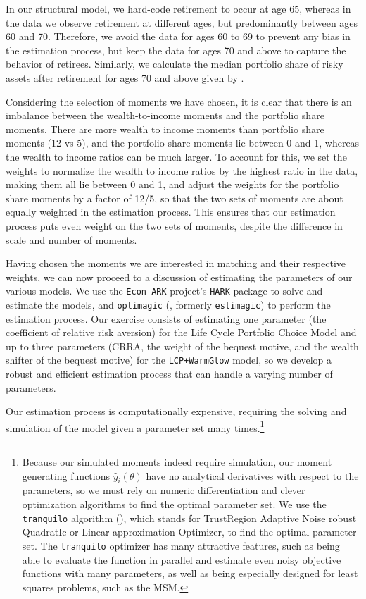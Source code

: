 \documentclass{article}
\begin{document}
In our structural model, we hard-code retirement to occur at age 65, whereas in the data we observe retirement at different ages, but predominantly between ages 60 and 70.
Therefore, we avoid the data for ages 60 to 69 to prevent any bias in the estimation process, but keep the data for ages 70 and above to capture the behavior of retirees.
Similarly, we calculate the median portfolio share of risky assets after retirement for ages 70 and above given by \cite{Aboagye2024}.

Considering the selection of moments we have chosen, it is clear that there is an imbalance between the wealth-to-income moments and the portfolio share moments.
There are more wealth to income moments than portfolio share moments (12 vs 5), and the portfolio share moments lie between 0 and 1, whereas the wealth to income ratios can be much larger.
To account for this, we set the weights to normalize the wealth to income ratios by the highest ratio in the data, making them all lie between 0 and 1, and adjust the weights for the portfolio share moments by a factor of 12/5, so that the two sets of moments are about equally weighted in the estimation process.
This ensures that our estimation process puts even weight on the two sets of moments, despite the difference in scale and number of moments.

Having chosen the moments we are interested in matching and their respective weights, we can now proceed to a discussion of estimating the parameters of our various models.
We use the \texttt{Econ-ARK} project's \texttt{HARK} package to solve and estimate the models, and \texttt{optimagic} (\cite{Gabler2022}, formerly \texttt{estimagic}) to perform the estimation process.
Our exercise consists of estimating one parameter (the coefficient of relative risk aversion) for the Life Cycle Portfolio Choice Model and up to three parameters (CRRA, the weight of the bequest motive, and the wealth shifter of the bequest motive) for the \texttt{LCP+WarmGlow} model, so we develop a robust and efficient estimation process that can handle a varying number of parameters. 

Our estimation process is computationally expensive, requiring the solving and simulation of the model given a parameter set many times.\footnote{Because our simulated moments indeed require simulation, our moment generating functions $\hat{y}_i(\theta)$ have no analytical derivatives with respect to the parameters, so we must rely on numeric differentiation and clever optimization algorithms to find the optimal parameter set.
We use the \texttt{tranquilo} algorithm (\cite{Gabler2024}), which stands for TrustRegion Adaptive Noise robust QuadratIc or Linear approximation Optimizer, to find the optimal parameter set.
The \texttt{tranquilo} optimizer has many attractive features, such as being able to evaluate the function in parallel and estimate even noisy objective functions with many parameters, as well as being especially designed for least squares problems, such as the MSM.}
\end{document}
